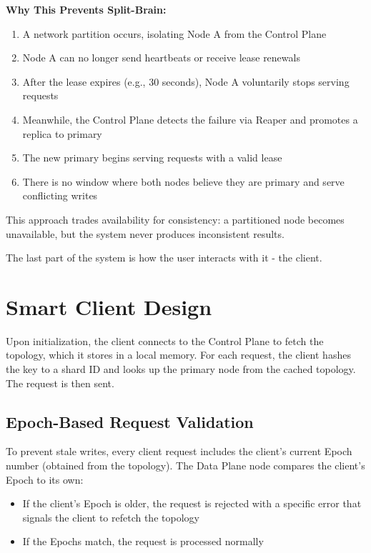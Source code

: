 \documentclass[shortabstract]{iithesis}
\begin{document}
\textbf{Why This Prevents Split-Brain:}
\begin{enumerate}
    \item A network partition occurs, isolating Node A from the Control Plane
    \item Node A can no longer send heartbeats or receive lease renewals
    \item After the lease expires (e.g., 30 seconds), Node A voluntarily stops serving requests
    \item Meanwhile, the Control Plane detects the failure via Reaper and promotes a replica to primary
    \item The new primary begins serving requests with a valid lease
    \item There is no window where both nodes believe they are primary and serve conflicting writes
\end{enumerate}

This approach trades availability for consistency: a partitioned node becomes unavailable, but the system never produces inconsistent results.

The last part of the system is how the user interacts with it - the client.

\section{Smart Client Design} \label{subsec:query_routing}
Upon initialization, the client connects to the Control Plane to fetch the topology, which it stores in a local memory. For each request, the client hashes the key to a shard ID and looks up the primary node from the cached topology. The request is then sent.

\subsection{Epoch-Based Request Validation}

To prevent stale writes, every client request includes the client's current Epoch number (obtained from the topology). The Data Plane node compares the client's Epoch to its own:
\begin{itemize}
    \item If the client's Epoch is older, the request is rejected with a specific error that signals the client to refetch the topology
    \item If the Epochs match, the request is processed normally
\end{itemize}
\end{document}
